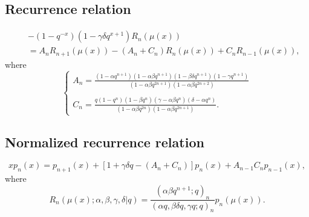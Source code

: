 \documentclass[envcountchap,graybox]{svmono}
\begin{document}
\subsection*{Recurrence relation}
\begin{eqnarray}
\label{RecqRacah}
& &-\left(1-q^{-x}\right)\left(1-\gamma\delta q^{x+1}\right)R_n(\mu(x))\nonumber\\
& &{}=A_nR_{n+1}(\mu(x))-\left(A_n+C_n\right)R_n(\mu(x))+C_nR_{n-1}(\mu(x)),
\end{eqnarray}
where
$$\left\{\begin{array}{l}
\displaystyle A_n=\frac{(1-\alpha q^{n+1})(1-\alpha\beta q^{n+1})(1-\beta\delta q^{n+1})(1-\gamma q^{n+1})}
{(1-\alpha\beta q^{2n+1})(1-\alpha\beta q^{2n+2})}\\
\\
\displaystyle C_n=\frac{q(1-q^n)(1-\beta q^n)(\gamma-\alpha\beta q^n)(\delta-\alpha q^n)}
{(1-\alpha\beta q^{2n})(1-\alpha\beta q^{2n+1})}.
\end{array}\right.$$

\subsection*{Normalized recurrence relation}
\begin{equation}
\label{NormRecqRacah}
xp_n(x)=p_{n+1}(x)+\left[1+\gamma\delta q-(A_n+C_n)\right]p_n(x)+A_{n-1}C_np_{n-1}(x),
\end{equation}
where
$$R_n(\mu(x);\alpha,\beta,\gamma,\delta|q)=
\frac{(\alpha\beta q^{n+1};q)_n}{(\alpha q,\beta\delta q,\gamma q;q)_n}p_n(\mu(x)).$$

\newpage
\end{document}
